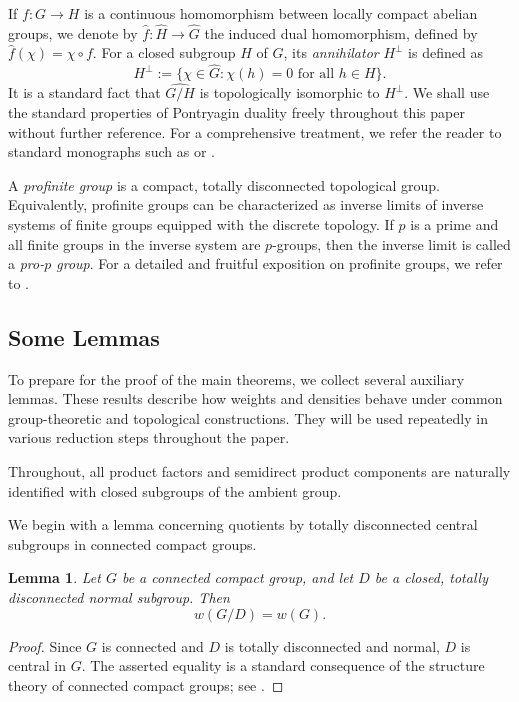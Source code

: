 \documentclass[12pt]{amsart}
\newtheorem{lemma}[theorem]{Lemma}
\theoremstyle{definition}
\numberwithin{equation}{section}
\theoremstyle{remark}
\begin{document}
If $f: G \to H$ is a continuous homomorphism between locally compact abelian groups, we denote by $\widehat{f}: \widehat{H} \to \widehat{G}$ the induced dual homomorphism, defined by $\widehat{f}(\chi) = \chi \circ f$. 
For a closed subgroup $H$ of $G$, its \emph{annihilator} $H^\perp$ is defined as
\[ H^\perp := \{ \chi \in \widehat{G} : \chi(h) = 0 \text{ for all } h \in H \}. \]
It is a standard fact that $\widehat{G/H}$ is topologically isomorphic to $H^\perp$. We shall use the standard properties of Pontryagin duality freely throughout this paper without further reference. For a comprehensive treatment, we refer the reader to standard monographs such as \cite{AT} or \cite{HR}.

A \emph{profinite group} is a compact, totally disconnected topological group. Equivalently, profinite groups can be characterized as inverse limits of inverse systems of finite groups equipped with the discrete topology. 
If $p$ is a prime and all finite groups in the inverse system are $p$-groups, then the inverse limit is called a \emph{pro-$p$ group}.
For a detailed and fruitful exposition on profinite groups, we refer to \cite{RZ}.

\subsection{Some Lemmas}

To prepare for the proof of the main theorems, we collect several auxiliary lemmas. These results describe how weights and densities behave under common group-theoretic and topological constructions. They will be used repeatedly in various reduction steps throughout the paper.

\medskip

Throughout, all product factors and semidirect product components are naturally identified with closed subgroups of the ambient group.

\medskip

We begin with a lemma concerning quotients by totally disconnected central subgroups in connected compact groups.

\begin{lemma}\label{conq}
Let $G$ be a connected compact group, and let $D$ be a closed, totally disconnected normal subgroup. Then
\[
w(G/D) = w(G).
\]
\end{lemma}

\begin{proof}
Since $G$ is connected and $D$ is totally disconnected and normal, $D$ is central in $G$. The asserted equality is a standard consequence of the structure theory of connected compact groups; see \cite[Proposition~12.19(iii)]{HM}.
\end{proof}
\end{document}
